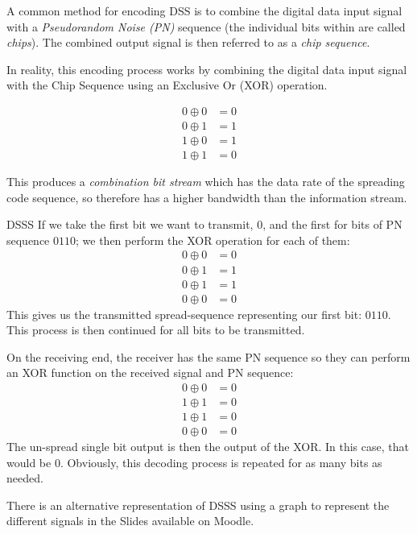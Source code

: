 A common method for encoding DSS is to combine the digital data input signal with a \textit{Pseudorandom Noise (PN)} sequence (the individual bits within are called \textit{chips}). The combined output signal is then referred to as a \textit{chip sequence}.

In reality, this encoding process works by combining the digital data input signal with the Chip Sequence using an Exclusive Or (XOR) operation. 

\begin{align*}
    0 \oplus 0 &= 0\\
    0 \oplus 1 &= 1\\
    1 \oplus 0 &= 1\\
    1 \oplus 1 &= 0
\end{align*}

This produces a \textit{combination bit stream} which has the data rate of the spreading code sequence, so therefore has a higher bandwidth than the information stream. 

\begin{example}{DSSS}
If we take the first bit we want to transmit, $0$, and the first for bits of PN sequence $0110$; we then perform the XOR operation for each of them:
\begin{align*}
    0 \oplus 0 &= 0\\
    0 \oplus 1 &= 1\\
    0 \oplus 1 &= 1\\
    0 \oplus 0 &= 0
\end{align*}
This gives us the transmitted spread-sequence representing our first bit: $0110$. This process is then continued for all bits to be transmitted.

On the receiving end, the receiver has the same PN sequence so they can perform an XOR function on the received signal and PN sequence:
\begin{align*}
    0 \oplus 0 &= 0\\
    1 \oplus 1 &= 0\\
    1 \oplus 1 &= 0\\
    0 \oplus 0 &= 0
\end{align*}
The un-spread single bit output is then the output of the XOR. In this case, that would be $0$. Obviously, this decoding process is repeated for as many bits as needed.
\end{example}

\begin{extlink}
There is an alternative representation of DSSS using a graph to represent the different signals in the Slides available on Moodle. 
\end{extlink}

